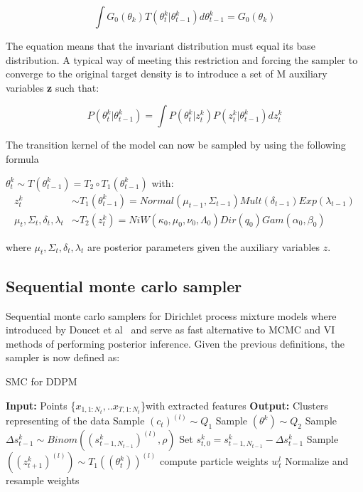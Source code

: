 \documentclass[]{article}
\begin{document}
$$ \int G_0(\theta_k) T(\theta_t^k | \theta_{t-1}^k) d\theta_{t-1}^k =  G_0(\theta_k) $$

The equation means that the invariant distribution must equal its base distribution. A typical way of meeting this restriction and forcing the sampler to converge to the original target density\cite{smc:theory} is to introduce a set of M auxiliary variables \textbf{z} such that:

$$ P(\theta_t^k | \theta_{t-1}^k) =  \int P(\theta_t^k | z_{t}^k)   P(z_t^k| \theta_{t-1}^k) dz_t^k $$

The transition kernel of the model can now be sampled by using the following formula

$\theta_t^k \sim T(\theta_{t-1}^k) = T_2 \circ T_1(\theta_{t-1}^k)$ with:
\begin{equation} \label{eq1}
    \begin{split}
        z_t^k  & \sim T_1(\theta_{t-1}^k)
        = Normal(\mu_{t-1}, \Sigma_{t-1}) Mult( \delta_{t-1}) Exp( \lambda_{t-1})\\
        \mu_t, \Sigma_t, \delta_t,  \lambda_t & \sim T_2(z_t^k)
        = NiW( \kappa_0, \mu_0, \nu_0, \Lambda_0 ) Dir(q_0) Gam(\alpha_0, \beta_0) 
    \end{split}
\end{equation}

where $\mu_t, \Sigma_t, \delta_t,  \lambda_t$  are posterior parameters given the auxiliary variables $z$.

\subsection{Sequential monte carlo sampler}

Sequential monte carlo samplers for Dirichlet process mixture models where introduced by Doucet et al~\cite{doucet} and serve as fast alternative to MCMC and VI methods of performing posterior inference. Given the previous definitions, the sampler is now defined as:


\begin{algorithm}[h]
    \caption{SMC for DDPM}\label{SMC}
    \begin{algorithmic}[1]
        \State \textbf{Input:} Points \{$x_{1,1:N_t}, ..x_{T,1:N_t}$\}with extracted features
        \State \textbf{Output:} Clusters representing of the data
        \State Sample $(c_t)^{(l)} \sim Q_1$  
        \State Sample $(\theta^k ) \sim Q_2$
        \EndFor		
        \EndFor
        \State Sample $\Delta s_{t-1}^k \sim Binom( (s_{t-1,N_{t-1}}^k)^{(l)}, \rho) $ 
        \State Set $s_{t,0}^{k} = s_{t-1,N_{t-1}}^{k} -\Delta s_{t-1}^k$
        \State Sample $( (z_{t+1}^k)^{(l)} ) \sim T_1((\theta_t^k))^{(l)} $
        \EndFor
        \State compute particle weights $w_t^l$
        \EndFor
        \State Normalize and resample weights
    \end{algorithmic}
\end{algorithm}
\end{document}
